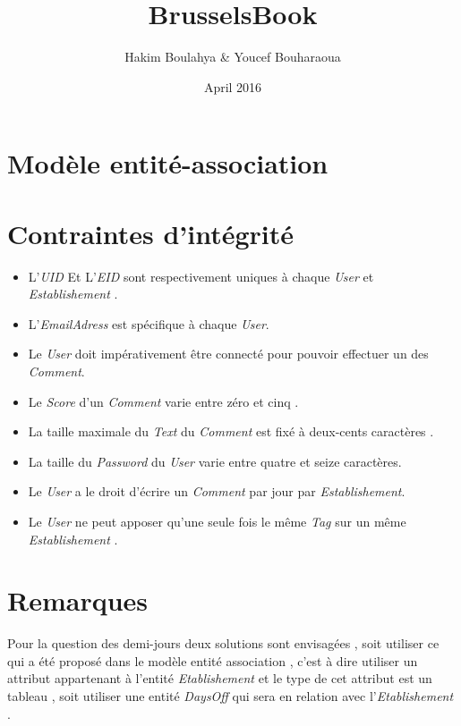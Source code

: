 \documentclass{article}
\title{BrusselsBook}
\author{Hakim Boulahya & Youcef Bouharaoua}
\date{April 2016}
\begin{document}
\maketitle

\section{Modèle entité-association}

\section{Contraintes d'intégrité}

\begin{itemize}
\item L'\textit{UID} Et L'\textit{EID}  sont respectivement  uniques à chaque \textsl{User} et \textsl{Establishement}  .

\item L'\textit{EmailAdress} est spécifique à chaque \textsl{User}.

\item Le \textsl{User} doit impérativement être connecté pour pouvoir effectuer un des \textsl{Comment}.

\item Le \textit{Score} d'un \textsl{Comment} varie entre zéro et cinq .

\item La taille maximale  du \textit{Text} du \textsl{Comment} est fixé à deux-cents  caractères .

\item La taille du \textit{Password} du \textsl{User} varie entre quatre et seize caractères.

\item Le \textsl{User} a le droit d'écrire un \textsl{Comment} par jour par \textsl{Establishement}.

\item Le \textsl{User} ne peut apposer qu'une seule fois le même \textsl{Tag} sur un même \textsl{Establishement} .

\end{itemize}

\section{Remarques}
Pour la question des demi-jours deux solutions sont envisagées , soit utiliser ce qui a été proposé dans le modèle entité association ,
c'est à dire utiliser un attribut appartenant à l'entité \textsl{Etablishement} et le type de cet attribut est un tableau ,
soit utiliser une entité \textsl{DaysOff} qui sera en relation avec l'\textsl{Etablishement} . 
\end{document}
